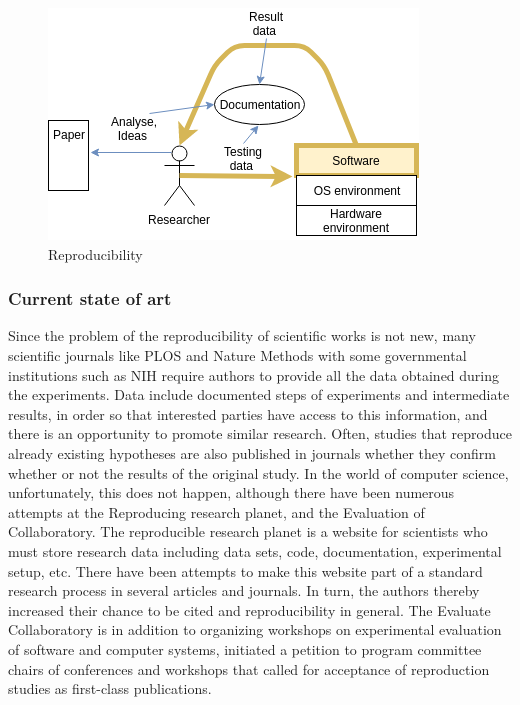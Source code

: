 \documentclass{vldb}
\begin{document}
\begin{figure}[h!]
  \includegraphics[scale=0.6]{fig/reproducibility.png}
  \caption{Reproducibility}
  \label{fig:reproducability}
\end{figure}
\subsubsection{Current state of art}
Since the problem of the reproducibility of scientific works is not new, many scientific journals like PLOS and  Nature Methods with some governmental institutions such as NIH require authors to provide all the data obtained during the experiments. Data include documented steps of experiments and intermediate results, in order so that interested parties have access to this information, and there is an opportunity to promote similar research. Often, studies that reproduce already existing hypotheses are also published in journals whether they confirm whether or not the results of the original study. In the world of computer science, unfortunately, this does not happen, although there have been numerous attempts at the Reproducing research planet\cite{rrp}, and the Evaluation of Collaboratory\cite{evcol}. The reproducible research planet is a website for scientists who must store research data including data sets, code, documentation, experimental setup, etc. There have been attempts to make this website part of a standard research process in several articles and journals. In turn, the authors thereby increased their chance to be cited and reproducibility in general. The Evaluate Collaboratory is in addition to organizing workshops on experimental evaluation of software and computer systems, initiated a petition to program committee chairs of conferences and workshops that called for acceptance of reproduction studies as first-class publications.
\end{document}
